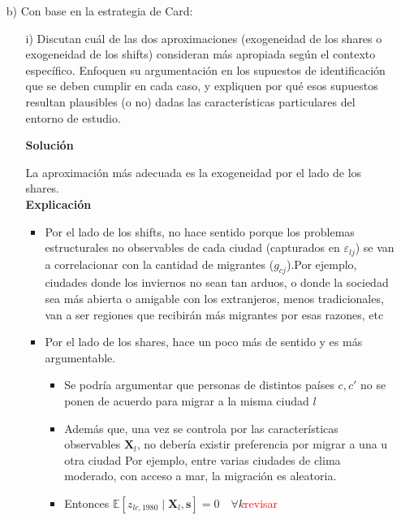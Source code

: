 \documentclass[a4paper, answers, addpoints, 11pt]{exam}
\newenvironment{solucion}{%
  \begin{mdframed}[
    backgroundcolor=blue!5,    %
    linecolor=blue!50,          %
    linewidth=2pt,              %
    leftmargin=10pt,            %
    rightmargin=8pt,           %
    topline=true,              %
    bottomline=true,            %
    roundcorner=10pt,           %
    innerleftmargin=10pt,       %
    innerrightmargin=10pt,      %
    innerbottommargin=10pt,     %
    innertopmargin=10pt         %
  ]%
  \begin{tcolorbox}[colframe=blue!50!black, colback=blue!50, coltitle=white, sharp corners=all, boxrule=1mm, width=\textwidth, halign=left, valign=center, top=0mm, bottom=0mm, left=0mm, right=0mm] \textbf{Solución} \end{tcolorbox} }{\end{mdframed}}
\begin{document}
\begin{itemize}

   

    \item[b)] Con base en la estrategia de Card:
    
    
     \begin{itemize}
         \item[i)] Discutan cuál de las dos aproximaciones (exogeneidad de los shares o exogeneidad de los shifts) consideran más apropiada según el contexto específico. Enfoquen su argumentación en los supuestos de identificación que se deben cumplir en cada caso, y expliquen por qué esos supuestos resultan plausibles (o no) dadas las características particulares del entorno de estudio. \\
        
         \begin{solucion}
         La aproximación más adecuada es la exogeneidad por el lado de los shares.\\
          \textbf{Explicación}{}
          \begin{itemize}
              \item Por el lado de los shifts, no hace sentido porque los problemas estructurales no observables de cada ciudad (capturados en $\varepsilon_{lj}$) se van a correlacionar con la cantidad de migrantes ($g_{cj}$).Por ejemplo, ciudades donde los inviernos no sean tan arduos, o donde la sociedad sea más abierta o amigable con los extranjeros, menos tradicionales, van a ser regiones que recibirán más migrantes por esas razones, etc
              \item Por el lado de los shares, hace un poco más de sentido y es más argumentable. 
              \begin{itemize}
              \item  Se podría argumentar que personas de distintos países $c, c'$ no se ponen de acuerdo para migrar a la misma ciudad $l$
              \item Además que, una vez se controla por las características observables $\boldsymbol{X}_l$, no debería existir preferencia por migrar a una u otra ciudad Por ejemplo, entre varias ciudades de clima moderado, con acceso a mar, la migración es aleatoria.
              \item Entonces $\mathbb{E}[z_{lc, 1980} \mid \boldsymbol{X}_l, \mathbf{s}] = 0 \quad \forall k$\textcolor{red}{revisar}
              \end{itemize}
              

\end{itemize}
\end{solucion}
\end{itemize}
\end{itemize}
\end{document}
